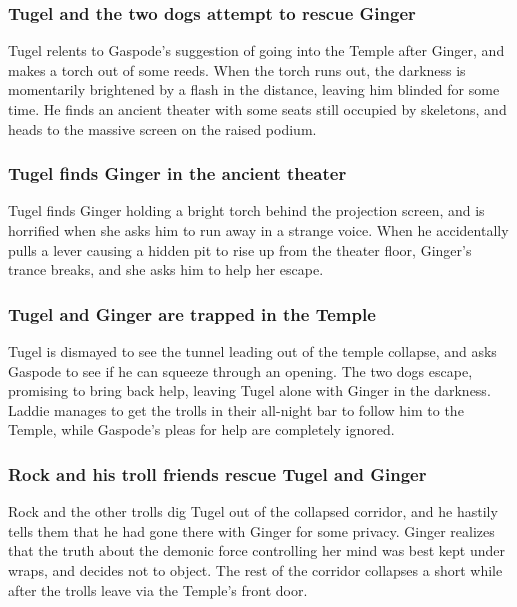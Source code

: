 \subsubsection{\Gls{Tugel} and the two dogs attempt to rescue \Gls{Ginger}}
\Gls{Tugel} relents to \Gls{Gaspode}'s suggestion of going into the Temple after \Gls{Ginger}, and
makes a torch out of some reeds. When the torch runs out, the darkness is momentarily brightened
by a flash in the distance, leaving him blinded for some time. He finds an ancient theater with some
seats still occupied by skeletons, and heads to the massive screen on the raised podium.

\subsubsection{\Gls{Tugel} finds \Gls{Ginger} in the ancient theater}
\Gls{Tugel} finds \Gls{Ginger} holding a bright torch behind the projection screen, and is
horrified when she asks him to run away in a strange voice. When he accidentally pulls a lever
causing a hidden pit to rise up from the theater floor, \Gls{Ginger}'s trance breaks, and she asks
him to help her escape.

\subsubsection{\Gls{Tugel} and \Gls{Ginger} are trapped in the Temple}
\Gls{Tugel} is dismayed to see the tunnel leading out of the temple collapse, and asks \Gls{Gaspode}
to see if he can squeeze through an opening. The two dogs escape, promising to bring back help,
leaving \Gls{Tugel} alone with \Gls{Ginger} in the darkness. \Gls{Laddie} manages to get the trolls
in their all-night bar to follow him to the Temple, while \Gls{Gaspode}'s pleas for help are
completely ignored.

\subsubsection{\Gls{Rock} and his troll friends rescue \Gls{Tugel} and \Gls{Ginger}}
\Gls{Rock} and the other trolls dig \Gls{Tugel} out of the collapsed corridor, and he hastily
tells them that he had gone there with \Gls{Ginger} for some privacy. \Gls{Ginger} realizes that
the truth about the demonic force controlling her mind was best kept under wraps, and decides not to
object. The rest of the corridor collapses a short while after the trolls leave via the Temple's
front door.

